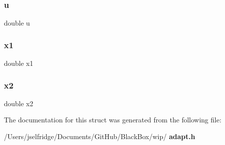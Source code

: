 \subsubsection{u}
{\footnotesize\ttfamily double u}

\mbox{\label{structadapt__struct_ac75b803b570527306e1e744bfb7a604f}} 
\subsubsection{x1}
{\footnotesize\ttfamily double x1}

\mbox{\label{structadapt__struct_adcf04f5f1964d18b332643939561da0d}} 
\subsubsection{x2}
{\footnotesize\ttfamily double x2}



The documentation for this struct was generated from the following file\+:\begin{DoxyCompactItemize}
\item 
/\+Users/jselfridge/\+Documents/\+Git\+Hub/\+Black\+Box/wip/\textbf{ adapt.\+h}\end{DoxyCompactItemize}
